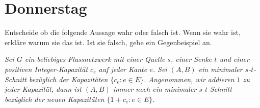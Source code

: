 \documentclass{uebung_cs}
\begin{document}
\section*{Donnerstag}

\begin{aufgabe}
    Entscheide ob die folgende Aussage wahr oder falsch ist. Wenn sie wahr ist, erkläre warum sie das ist. Ist sie falsch, gebe ein Gegenbeispiel an.
    
    \textit{Sei $G$ ein beliebiges Flussnetzwerk mit einer Quelle $s$, einer Senke $t$ und einer positiven Integer-Kapazität $c_e$ auf jeder Kante $e$. Sei $(A,B)$ ein minimaler $s$-$t$-Schnitt bezüglich der Kapazitäten $\{c_e : e \in E\}$. Angenommen, wir addieren $1$ zu jeder Kapazität, dann ist $(A,B)$ immer noch ein minimaler $s$-$t$-Schnitt bezüglich der neuen Kapazitäten $\{1 + c_e : e \in E\}$.}
\end{aufgabe}
\end{document}
